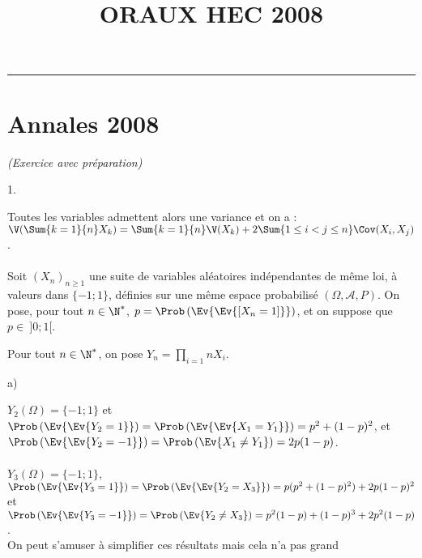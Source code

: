 \documentclass[11pt]{article}%
\title{\bf \vspace{-1cm} ORAUX HEC 2008} %
\author{} %
\date{} %
\begin{document}
\maketitle %
\vspace{-1.2cm}\hrule %
\thispagestyle{fancy}

\vspace*{.4cm}


\section{Annales 2008}


 \begin{exercice}{\it (Exercice avec préparation)}~
 \begin{noliste}{1.}
 \setlength{\itemsep}{4mm}
 \item Toutes les variables admettent alors une variance et on a : \\
 $\V( \Sum{k = 1}{n} X_{k} ) = \Sum{k = 1}{n} \V(X_{k}) + 2 \Sum{1 \leq
i < j \leq n} \Cov (X_{i}, X_{j})$. \\
\\
 Soit $(X_{n})_{n \geq 1}$ une suite de variables aléatoires
indépendantes de même loi, à valeurs dans $\{-1 ; 1\}$, définies sur
une même espace probabilisé $(\Omega, \mathcal{A}, P)$. On pose, pour
tout $n \in \N^*$, $p = \Prob\left(\Ev{\Ev{[X_{n} = 1]}}\right)$, et on
suppose que $p \in \ ] 0 ; 1[$. \\
 \item Pour tout $n \in \N^*$, on pose $Y_{n} = \prod\limits_{i = 1}{n}
X_{i}$.
 \begin{noliste}{a)}
 \setlength{\itemsep}{2mm} 
 \item $Y_{2} (\Omega) = \{ -1 ; 1\}$ et $\Prob\left(\Ev{\Ev{Y_{2} =
1}}\right) = \Prob\left(\Ev{\Ev{ X_{1} = Y_{1}}}\right) = p^{2} +
(1-p)^{2}$, et $\Prob\left(\Ev{\Ev{Y_{2} = -1}}\right) =
\Prob\left(\Ev{ X_{1} \neq Y_{1}}\right) = 2 p (1-p)$. \\
\\
 $Y_{3} (\Omega) = \{ -1 ; 1\}$, $\Prob\left(\Ev{\Ev{Y_{3} = 1}}\right)
= \Prob\left(\Ev{\Ev{Y_{2} = X_{3}}}\right) = p (p^{2} + (1-p)^{2} ) +
2 p (1-p)^{2}$ et $\Prob\left(\Ev{\Ev{Y_{3} = -1}}\right) =
\Prob\left(\Ev{ Y_{2} \neq X_{3}}\right) = p^{2} (1-p) + (1-p)^{3} + 2
p^{2} (1-p)$. \\
 On peut s'amuser à simplifier ces résultats mais cela n'a pas grand

\end{noliste}
\end{noliste}
\end{exercice}
\end{document}
